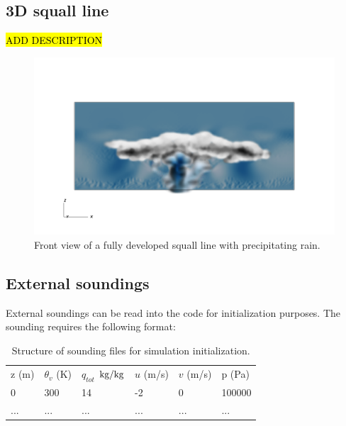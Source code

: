\documentclass{article}
\begin{document}
\subsection{3D squall line}
\label{sq3D}
\hl{ADD DESCRIPTION}
\begin{figure}[htbp]
\includegraphics[width=1.2\textwidth]{figures/squall_working_warm_rain_frontal_view0028.png}
\caption{Front view of a fully developed squall line with precipitating rain. }
\label{fig:benchmarks/squall1}
\end{figure}


\subsection{External soundings}
External soundings can be read into the code for initialization purposes. The sounding requires the following format:

\begin{table}[t]
\centering
{\footnotesize
\caption[short]{Structure of sounding files for simulation initialization.}
\label{DeltaDefinitionsTable}
\begin{tabular*}{\textwidth}{ @{\extracolsep{\fill}} llllll}
\hline
\hline
z (m) & $\theta_v$ (K) & $q_{tot}$ $\rm {kg/kg}$ & $u$ (m/s) & $v$ (m/s) & p (Pa)\\
0 & 300 & 14  & -2 & 0 & 100000\\
... & ... & ...  & ... & ... & ...\\
\hline

\hline
\hline
\end{tabular*}
}
\end{table}
\end{document}
